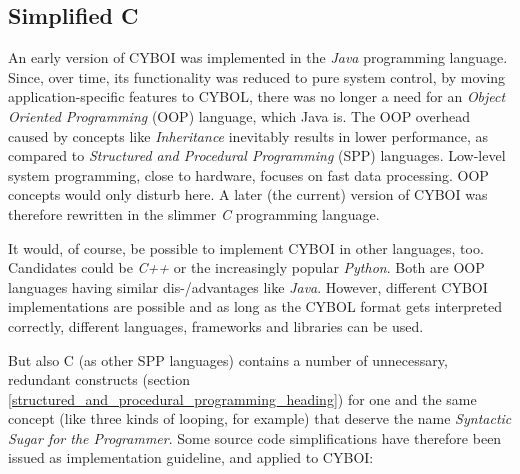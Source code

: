 %
%
%
%
%
%
%

\subsection{Simplified C}
\label{simplified_c_heading}

An early version of CYBOI was implemented in the \emph{Java} programming
language. Since, over time, its functionality was reduced to pure system
control, by moving application-specific features to CYBOL, there was no longer
a need for an \emph{Object Oriented Programming} (OOP) language, which Java is.
The OOP overhead caused by concepts like \emph{Inheritance} inevitably results
in lower performance, as compared to \emph{Structured and Procedural Programming}
(SPP) languages. Low-level system programming, close to hardware, focuses on
fast data processing. OOP concepts would only disturb here. A later (the
current) version of CYBOI was therefore rewritten in the slimmer \emph{C}
programming language.

It would, of course, be possible to implement CYBOI in other languages, too.
Candidates could be \emph{C++} or the increasingly popular \emph{Python}. Both
are OOP languages having similar dis-/advantages like \emph{Java}. However,
different CYBOI implementations are possible and as long as the CYBOL format
gets interpreted correctly, different languages, frameworks and libraries can
be used.

But also C (as other SPP languages) contains a number of unnecessary,
redundant constructs (section \ref{structured_and_procedural_programming_heading})
for one and the same concept (like three kinds of looping, for example) that
deserve the name \emph{Syntactic Sugar for the Programmer}. Some source code
simplifications have therefore been issued as implementation guideline, and
applied to CYBOI:

